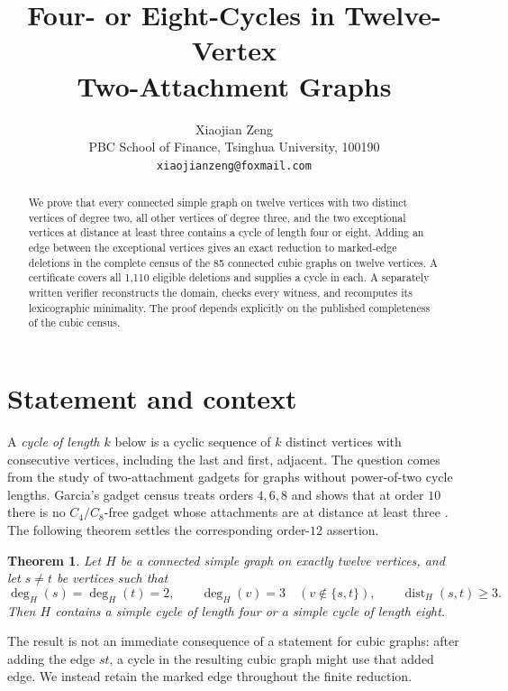 \documentclass[11pt]{article}
\title{Four- or Eight-Cycles in Twelve-Vertex\\
Two-Attachment Graphs}
\author{Xiaojian Zeng\\
PBC School of Finance, Tsinghua University, 100190\\
\texttt{xiaojianzeng@foxmail.com}}
\date{}
\newtheorem{theorem}{Theorem}
\begin{document}
\maketitle

\begin{abstract}
We prove that every connected simple graph on twelve vertices with two
distinct vertices of degree two, all other vertices of degree three, and the
two exceptional vertices at distance at least three contains a cycle of
length four or eight.  Adding an edge between the exceptional vertices gives
an exact reduction to marked-edge deletions in the complete census of the 85
connected cubic graphs on twelve vertices.  A certificate covers all 1,110
eligible deletions and supplies a cycle in each.  A separately written
verifier reconstructs the domain, checks every witness, and recomputes its
lexicographic minimality.  The proof depends explicitly on the published
completeness of the cubic census.
\end{abstract}

\section{Statement and context}

A \emph{cycle of length $k$} below is a cyclic sequence of $k$ distinct
vertices with consecutive vertices, including the last and first, adjacent.
The question comes from the study of two-attachment gadgets for graphs without
power-of-two cycle lengths.  Garcia's gadget census treats orders $4,6,8$ and
shows that at order $10$ there is no $C_4/C_8$-free gadget whose attachments
are at distance at least three \cite[Proposition~6.2(2)]{Garcia2026}.
The following theorem settles the corresponding order-$12$ assertion.

\begin{theorem}\label{thm:main}
Let $H$ be a connected simple graph on exactly twelve vertices, and let
$s\ne t$ be vertices such that
\[
 \operatorname{deg}_H(s)=\operatorname{deg}_H(t)=2,\qquad
 \operatorname{deg}_H(v)=3\quad(v\notin\{s,t\}),
 \qquad \operatorname{dist}_H(s,t)\geq 3.
\]
Then $H$ contains a simple cycle of length four or a simple cycle of length
eight.
\end{theorem}

The result is not an immediate consequence of a statement for cubic graphs:
after adding the edge $st$, a cycle in the resulting cubic graph might use
that added edge.  We instead retain the marked edge throughout the finite
reduction.
\end{document}
